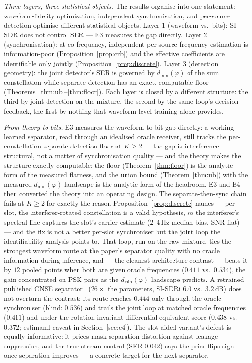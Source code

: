\documentclass[journal]{IEEEtran}
\begin{document}
\emph{Three layers, three statistical objects.} The results organise
into one statement: waveform-fidelity optimisation, independent
synchronisation, and per-source detection optimise different
statistical objects. Layer 1 (waveform vs.\ bits): SI-SDR
does not control SER --- E3 measures the gap directly. Layer 2
(synchronisation): at co-frequency, independent per-source frequency
estimation is information-poor (Proposition~\ref{prop:crb}) and the
effective coefficients are identifiable only jointly
(Proposition~\ref{prop:discrete}). Layer 3 (detection geometry): the
joint detector's SER is governed by $d_{\min}(\varphi)$ of the sum
constellation while separate detection has an exact, computable floor
(Theorems~\ref{thm:ub}--\ref{thm:floor}). Each layer is closed by a
different structure: the third by joint detection on the mixture, the
second by the same loop's decision feedback, the first
by nothing that waveform-level training alone provides.

\emph{From theory to bits.} E3 measures the
waveform-to-bit gap directly: a working learned separator, read through
an idealised oracle receiver, still tracks the per-constellation
separate-detection
floor at $K \geq 2$ --- the gap is interference-structural, not a
matter of synchronisation quality --- and the theory makes the
structure exactly computable: the floor
(Theorem~\ref{thm:floor}) is the analytic form of the measured flatness,
and the union bound (Theorem~\ref{thm:ub}) with the measured
$d_{\min}(\varphi)$ landscape is the analytic form of the headroom. E3
and E4 then converted the theory into an operating design. The
separate-then-sync chain fails at $K \geq 2$ for exactly the reason
Proposition~\ref{prop:discrete} names --- per slot, the
interferer-rotated constellation is a valid hypothesis, so the
interferer's spectral line captures the slot's carrier estimate
($2$--$4$\,Hz median bias, SNR-flat) --- and the fix is not a better
per-slot synchroniser but the joint loop the identifiability analysis
points to. That loop, run on the raw mixture, ties the strongest
waveform route at the paper's separator quality with no oracle information
during inference, and --- the cleanest architecture contrast --- beats
it by $12$ pooled points when both are given oracle frequencies
($0.411$ vs.\ $0.534$), the gain concentrated on PSK pairs as the
$d_{\min}(\varphi)$ landscape predicts. A retrained published CNSE
separator~\cite{hou2022single} ($26\times$ the parameters, SI-SDRi
$6.0$ vs.\ $3.2$\,dB) does not overturn the contrast: its route
reaches $0.444$ only through the oracle synchroniser (blind:
$0.536$) and trails the joint loop at matched oracle frequencies
($0.411$) and under the rotation-invariant differential-equivalent
score ($0.438$ vs.\ $0.372$; estimand caveat in
Section~\ref{sec:e4}).
The slot-aided variant's defeat is equally informative: it prices
mask-separation distortion against leakage suppression, and the
true-stream control (SER $0.042$) says the price flips sign once
separation improves --- a concrete target for the next separator.
\end{document}
